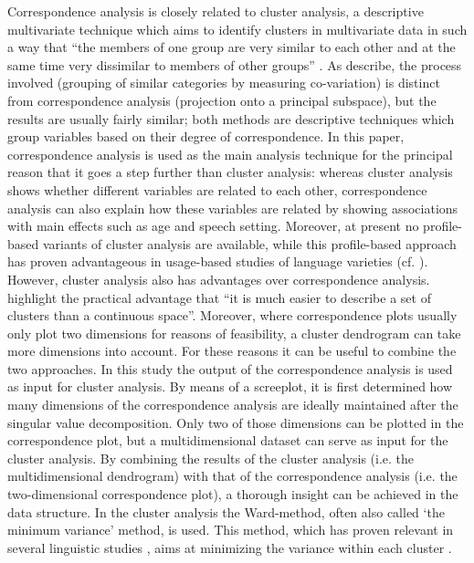 \documentclass[output=paper]{LSP/langsci}
\begin{document}
Correspondence analysis is closely related to cluster analysis, a descriptive multivariate technique which aims to identify clusters in multivariate data in such a way that “the members of one group are very similar to each other and at the same time very dissimilar to members of other groups” \citep[337]{gries_statistics_2013}. As \citet{lebart_correspondence_1993} describe, the process involved (grouping of similar categories by measuring co-variation) is distinct from correspondence analysis (projection onto a principal subspace), but the results are usually fairly similar; both methods are descriptive techniques which group variables based on their degree of correspondence. In this paper, correspondence analysis is used as the main analysis technique for the principal reason that it goes a step further than cluster analysis: whereas cluster analysis shows whether different variables are related to each other, correspondence analysis can also explain how these variables are related by showing associations with main effects such as age and speech setting. Moreover, at present no profile-based variants of cluster analysis are available, while this profile-based approach has proven advantageous in usage-based studies of language varieties (cf. \citealt{speelman_profile-based_2003}). However, cluster analysis also has advantages over correspondence analysis. \citet[15]{lebart_correspondence_1993} highlight the practical advantage that “it is much easier to describe a set of clusters than a continuous space”. Moreover, where correspondence plots usually only plot two dimensions for reasons of feasibility, a cluster dendrogram can take more dimensions into account. For these reasons it can be useful to combine the two approaches. In this study the output of the correspondence analysis is used as input for cluster analysis. By means of a screeplot, it is first determined how many dimensions of the correspondence analysis are ideally maintained after the singular value decomposition. Only two of those dimensions can be plotted in the correspondence plot, but a multidimensional dataset can serve as input for the cluster analysis. By combining the results of the cluster analysis (i.e. the multidimensional dendrogram) with that of the correspondence analysis (i.e. the two-dimensional correspondence plot), a thorough insight can be achieved in the data structure. In the cluster analysis the Ward-method, often also called ‘the minimum variance’ method, is used. This method, which has proven relevant in several linguistic studies \citep{gries_statistics_2013}, aims at minimizing the variance within each cluster \citep[317]{gries_statistics_2013}.
\end{document}
